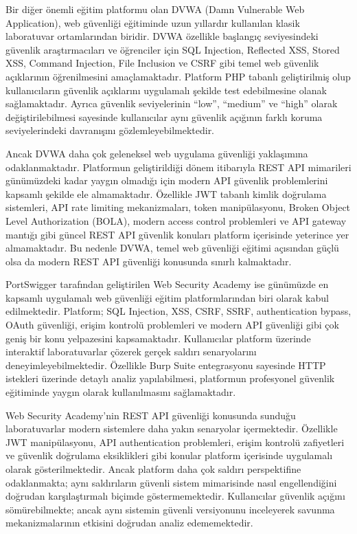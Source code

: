 Bir diğer önemli eğitim platformu olan DVWA (Damn Vulnerable Web Application), web güvenliği eğitiminde uzun yıllardır kullanılan klasik laboratuvar ortamlarından biridir. DVWA özellikle başlangıç seviyesindeki güvenlik araştırmacıları ve öğrenciler için SQL Injection, Reflected XSS, Stored XSS, Command Injection, File Inclusion ve CSRF gibi temel web güvenlik açıklarının öğrenilmesini amaçlamaktadır. Platform PHP tabanlı geliştirilmiş olup kullanıcıların güvenlik açıklarını uygulamalı şekilde test edebilmesine olanak sağlamaktadır. Ayrıca güvenlik seviyelerinin “low”, “medium” ve “high” olarak değiştirilebilmesi sayesinde kullanıcılar aynı güvenlik açığının farklı koruma seviyelerindeki davranışını gözlemleyebilmektedir.

Ancak DVWA daha çok geleneksel web uygulama güvenliği yaklaşımına odaklanmaktadır. Platformun geliştirildiği dönem itibarıyla REST API mimarileri günümüzdeki kadar yaygın olmadığı için modern API güvenlik problemlerini kapsamlı şekilde ele almamaktadır. Özellikle JWT tabanlı kimlik doğrulama sistemleri, API rate limiting mekanizmaları, token manipülasyonu, Broken Object Level Authorization (BOLA), modern access control problemleri ve API gateway mantığı gibi güncel REST API güvenlik konuları platform içerisinde yeterince yer almamaktadır. Bu nedenle DVWA, temel web güvenliği eğitimi açısından güçlü olsa da modern REST API güvenliği konusunda sınırlı kalmaktadır.

PortSwigger tarafından geliştirilen Web Security Academy ise günümüzde en kapsamlı uygulamalı web güvenliği eğitim platformlarından biri olarak kabul edilmektedir. Platform; SQL Injection, XSS, CSRF, SSRF, authentication bypass, OAuth güvenliği, erişim kontrolü problemleri ve modern API güvenliği gibi çok geniş bir konu yelpazesini kapsamaktadır. Kullanıcılar platform üzerinde interaktif laboratuvarlar çözerek gerçek saldırı senaryolarını deneyimleyebilmektedir. Özellikle Burp Suite entegrasyonu sayesinde HTTP istekleri üzerinde detaylı analiz yapılabilmesi, platformun profesyonel güvenlik eğitiminde yaygın olarak kullanılmasını sağlamaktadır.

Web Security Academy’nin REST API güvenliği konusunda sunduğu laboratuvarlar modern sistemlere daha yakın senaryolar içermektedir. Özellikle JWT manipülasyonu, API authentication problemleri, erişim kontrolü zafiyetleri ve güvenlik doğrulama eksiklikleri gibi konular platform içerisinde uygulamalı olarak gösterilmektedir. Ancak platform daha çok saldırı perspektifine odaklanmakta; aynı saldırıların güvenli sistem mimarisinde nasıl engellendiğini doğrudan karşılaştırmalı biçimde göstermemektedir. Kullanıcılar güvenlik açığını sömürebilmekte; ancak aynı sistemin güvenli versiyonunu inceleyerek savunma mekanizmalarının etkisini doğrudan analiz edememektedir.

